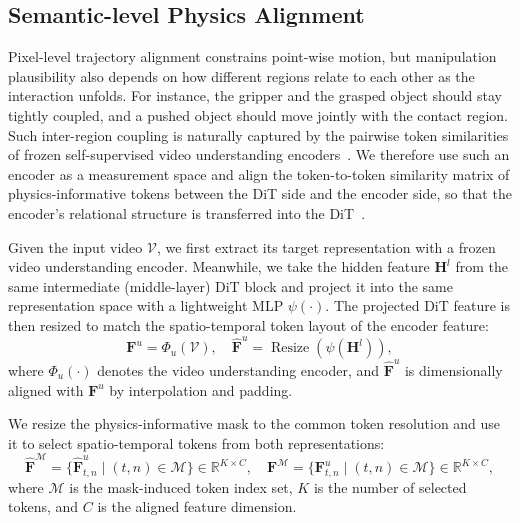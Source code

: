 \subsection{Semantic-level Physics Alignment}

Pixel-level trajectory alignment constrains point-wise motion, but manipulation plausibility also
depends on how different regions relate to each other as the interaction unfolds. For instance,
the gripper and the grasped object should stay tightly coupled, and a pushed object should move
jointly with the contact region. Such inter-region coupling is naturally captured by the pairwise
token similarities of frozen self-supervised video understanding
encoders~\cite{bardes2024revisiting}. We therefore use such an encoder as a measurement space and
align the token-to-token similarity matrix of physics-informative tokens between the DiT side and
the encoder side, so that the encoder's relational structure is transferred into the DiT~\cite{zhang2025videorepa, simeoni2025dinov3}.

Given the input video $\mathcal{V}$, we first extract its target representation with a frozen video
understanding encoder. Meanwhile, we take the hidden feature $\mathbf{H}^{l}$ from the same intermediate (middle-layer) DiT
block and project it into the same representation space with a lightweight MLP $\psi(\cdot)$. The
projected DiT feature is then resized to match the spatio-temporal token layout of the encoder feature:
\begin{equation}
\mathbf{F}^{u}
=
\Phi_{u}(\mathcal{V}),
\quad
\hat{\mathbf{F}}^{u}
=
\operatorname{Resize}\left(\psi(\mathbf{H}^{l})\right),
\end{equation}
where $\Phi_{u}(\cdot)$ denotes the video understanding encoder, and
$\hat{\mathbf{F}}^{u}$ is dimensionally aligned with $\mathbf{F}^{u}$ by interpolation and padding.

We resize the physics-informative mask to the common token resolution and use it to select
spatio-temporal tokens from both representations:
\begin{equation}
\hat{\mathbf{F}}^{\mathcal{M}}
=
\{\hat{\mathbf{F}}^{u}_{t,n}\mid (t,n)\in\mathcal{M}\}
\in\mathbb{R}^{K\times C},
\quad
\mathbf{F}^{\mathcal{M}}
=
\{\mathbf{F}^{u}_{t,n}\mid (t,n)\in\mathcal{M}\}
\in\mathbb{R}^{K\times C},
\end{equation}
where $\mathcal{M}$ is the mask-induced token index set, $K$ is the number of selected tokens, and
$C$ is the aligned feature dimension.

